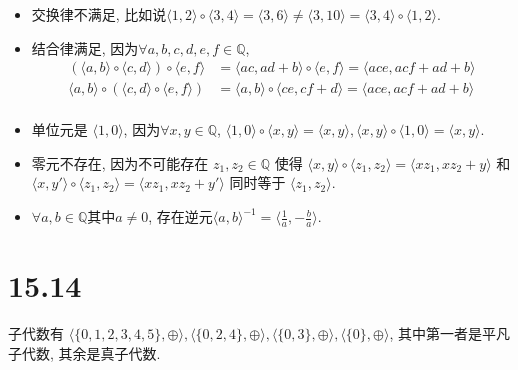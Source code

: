 \documentclass[8pt]{article}
\theoremstyle{compact}
\begin{document}
\begin{itemize}
	\item 交换律不满足, 比如说$\langle 1, 2 \rangle \circ \langle 3, 4 \rangle = \langle 3, 6 \rangle \neq \langle 3, 10 \rangle = \langle 3, 4 \rangle \circ \langle 1, 2 \rangle$.
	\item 结合律满足, 因为$\forall a, b, c, d, e, f \in \mathbb Q$, \begin{align*}
		(\langle a, b \rangle \circ \langle c, d \rangle) \circ \langle e, f \rangle &= \langle ac, ad + b \rangle \circ \langle e, f \rangle = \langle ace, acf + ad + b \rangle\\
		\langle a, b \rangle \circ (\langle c, d \rangle \circ \langle e, f \rangle) &= \langle a, b \rangle \circ \langle ce, cf + d \rangle = \langle ace, acf + ad + b \rangle\\
	\end{align*}
	\item 单位元是 $\langle 1, 0 \rangle$, 因为$\forall x, y \in \mathbb Q$, $\langle 1, 0 \rangle \circ \langle x, y \rangle = \langle x, y \rangle, \langle x, y \rangle \circ \langle 1, 0 \rangle = \langle x, y \rangle$.
	\item 零元不存在, 因为不可能存在 $z_1, z_2 \in \mathbb Q$ 使得 $\langle x, y \rangle \circ \langle z_1, z_2 \rangle = \langle xz_1, xz_2 + y \rangle$ 和 $\langle x, y' \rangle \circ \langle z_1, z_2 \rangle = \langle xz_1, xz_2 + y' \rangle$ 同时等于 $\langle z_1, z_2 \rangle$.
	\item $\forall a, b \in \mathbb Q$其中$a \neq 0$, 存在逆元$\langle a, b \rangle^{-1} = \langle \frac 1a, -\frac{b}{a} \rangle$.
\end{itemize}
\section*{15.14}

子代数有 $\langle \{0, 1, 2, 3, 4, 5\}, \oplus \rangle , \langle \{0, 2, 4\}, \oplus \rangle , \langle \{0, 3\}, \oplus \rangle , \langle \{0\}, \oplus \rangle $, 其中第一者是平凡子代数, 其余是真子代数.
\end{document}

